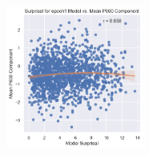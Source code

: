 \documentclass{IEEEtran}
\begin{document}
\begin{figure}[h]
    \centering
    \includegraphics[width=0.4\textwidth]{surprisal_vs_p600/epoch1.png}
\end{figure}
\end{document}
